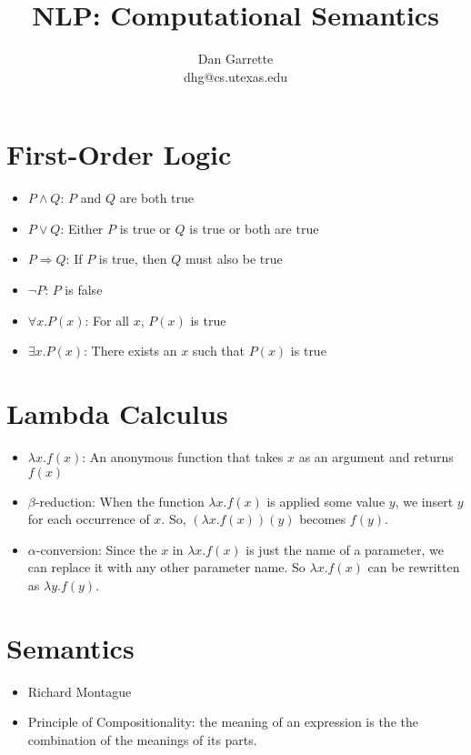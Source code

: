 \documentclass[11pt,letterpaper]{article}
\title{NLP: Computational Semantics}
\author{Dan Garrette\\\small{dhg@cs.utexas.edu}}
\begin{document}
\maketitle



\section{First-Order Logic}

\begin{itemize}
  \item $P \land Q$: $P$ and $Q$ are both true
  \item $P \lor Q$: Either $P$ is true or $Q$ is true or both are true
  \item $P \Rightarrow Q$: If $P$ is true, then $Q$ must also be true
  \item $\lnot P$: $P$ is false
  \item $\forall x.P(x)$: For all $x$, $P(x)$ is true
  \item $\exists x.P(x)$: There exists an $x$ such that $P(x)$ is true
\end{itemize}

\section{Lambda Calculus}

\begin{itemize}
  \item $\lambda x.f(x)$: An anonymous function that takes $x$ as an argument and returns $f(x)$
  \item $\beta$-reduction: When the function $\lambda x.f(x)$ is applied some value $y$, we insert $y$ for each occurrence of $x$.  So, $(\lambda x.f(x))(y)$ becomes $f(y)$.
  \item $\alpha$-conversion: Since the $x$ in $\lambda x.f(x)$ is just the name of a parameter, we can replace it with any other parameter name.  So $\lambda x.f(x)$ can be rewritten as $\lambda y.f(y)$.
\end{itemize}


\section{Semantics}

\begin{itemize}
  \item Richard Montague
  \item Principle of Compositionality: the meaning of an expression is the the combination of the meanings of its parts.
\end{itemize}
\end{document}
